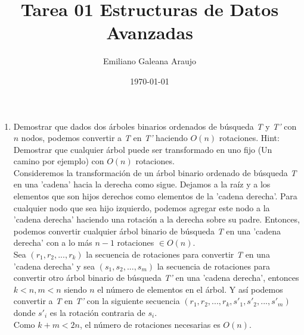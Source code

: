 \documentclass[spanish,12pt,letterpaper]{article}
\title{Tarea 01 Estructuras de Datos Avanzadas}
\author{Emiliano Galeana Araujo}
\affil{Facultad de Ciencias, UNAM}
\date{\today}
\begin{document}
\maketitle

\begin{enumerate}
\item Demostrar que dados dos árboles binarios ordenados de búsqueda \textit{T} y
  \textit{T'} con $n$ nodos, podemos convertir a \textit{T} en \textit{T'}
  haciendo $O(n)$ rotaciones. Hint: Demostrar que cualquier árbol puede ser
  transformado en uno fijo (Un camino por ejemplo) con $O(n)$ rotaciones.\\
  Consideremos la transformación de un árbol binario ordenado de búsqueda
  \textit{T} en una 'cadena' hacia la derecha como sigue. Dejamos a la raíz y a
  los elementos que son hijos derechos como elementos de la 'cadena derecha'.
  Para cualquier nodo que sea hijo izquierdo, podemos agregar este nodo a la
  'cadena derecha' haciendo una rotación a la derecha sobre su padre. Entonces,
  podemos convertir cualquier árbol binario de búsqueda \textit{T} en una 'cadena
  derecha' con a lo más $n-1$ rotaciones $\in O(n)$.\\
  Sea $(r_1, r_2, ..., r_k)$ la secuencia de rotaciones para convertir \textit{T} 
  en una 'cadena derecha' y sea $(s_1, s_2, ..., s_m)$ la secuencia de rotaciones 
  para convertir otro árbol binario de búsqueda \textit{T'} en una 'cadena
  derecha', entonces $k < n, m < n$ siendo $n$ el número de elementos en el
  árbol. Y así podemos convertir a \textit{T} en \textit{T'} con la siguiente
  secuencia $(r_1, r_2, ..., r_k, s'_1, s'_2, ..., s'_m)$ donde $s'_i$ es la
  rotación contraria de $s_i$.\\
  Como $k+m < 2n$, el número de rotaciones necesarias es $O(n)$.
  

\end{enumerate}
\end{document}
